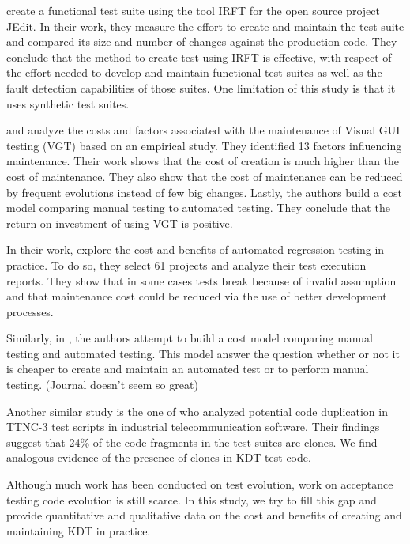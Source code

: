 \citep{Shewchuk2010} create a functional test suite using the tool IRFT for the open source project JEdit. In their work, they measure the effort to create and maintain the test suite and compared its size and number of changes against the production code. They conclude that the method to create test using IRFT is effective, with respect of the effort needed to develop and maintain functional test suites as well as the fault detection capabilities of those suites. One limitation of this study is that it uses synthetic test suites.

\citep{Alegroth2013} and \citep{Alegroth2016} analyze the costs and factors associated with the maintenance of Visual GUI testing (VGT) based on an empirical study. They identified 13 factors influencing maintenance. Their work shows that the cost of creation is much higher than the cost of maintenance. They also show that the cost of maintenance can be reduced by frequent evolutions instead of few big changes. Lastly, the authors build a cost model comparing manual testing to automated testing. They conclude that the return on investment of using VGT is positive.

In their work, \citep{Labuschagne2017} explore the cost and benefits of automated regression testing in practice. To do so, they select 61 projects and analyze their test execution reports. They show that in some cases tests break because of invalid assumption and that maintenance cost could be reduced via the use of better development processes.

Similarly, in \cite{Kan2013}, the authors attempt to build a cost model comparing manual testing and automated testing. This model answer the question whether or not it is cheaper to create and maintain an automated test or to perform manual testing. (Journal doesn't seem so great)

Another similar study is the one of \citep{Lavoie2017} who analyzed potential code duplication in TTNC-3 test scripts in industrial telecommunication software. Their findings suggest that 24\% of the code fragments in the test suites are clones. We find analogous evidence of the presence of clones in KDT test code.

Although much work has been conducted on test evolution, work on acceptance testing code evolution is still scarce. In this study, we try to fill this gap and provide quantitative and qualitative data on the cost and benefits of creating and maintaining KDT in practice.


